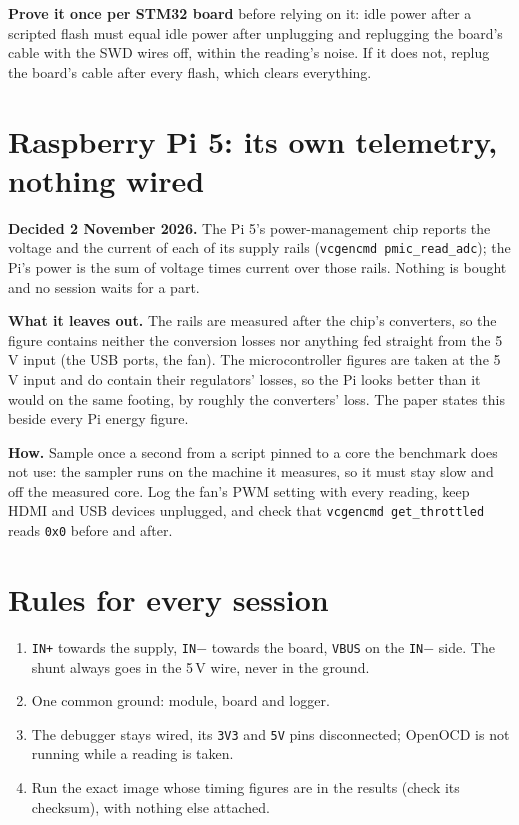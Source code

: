 \documentclass[11pt]{article}
\newcommand{\code}[1]{\texttt{#1}}
\begin{document}
\textbf{Prove it once per STM32 board} before relying on it: idle power after a scripted flash
must equal idle power after unplugging and replugging the board's cable with the SWD wires off,
within the reading's noise. If it does not, replug the board's cable after every flash, which
clears everything.

\section{\texorpdfstring{Raspberry Pi 5: its own telemetry, nothing wired}{Raspberry Pi 5: its own telemetry, nothing wired}}

\textbf{Decided 2 November 2026.} The Pi 5's power-management chip reports the voltage and the
current of each of its supply rails (\code{vcgencmd pmic\_read\_adc}); the Pi's power is the sum
of voltage times current over those rails. Nothing is bought and no session waits for a part.

\textbf{What it leaves out.} The rails are measured after the chip's converters, so the figure
contains neither the conversion losses nor anything fed straight from the 5\,V input (the USB
ports, the fan). The microcontroller figures are taken at the 5\,V input and do contain their
regulators' losses, so the Pi looks better than it would on the same footing, by roughly the
converters' loss. The paper states this beside every Pi energy figure.

\textbf{How.} Sample once a second from a script pinned to a core the benchmark does not use:
the sampler runs on the machine it measures, so it must stay slow and off the measured core.
Log the fan's PWM setting with every reading, keep HDMI and USB devices unplugged, and check
that \code{vcgencmd get\_throttled} reads \code{0x0} before and after.

\section{Rules for every session}
\begin{enumerate}
\item \code{IN+} towards the supply, \code{IN$-$} towards the board, \code{VBUS} on the
\code{IN$-$} side. The shunt always goes in the 5\,V wire, never in the ground.
\item One common ground: module, board and logger.
\item The debugger stays wired, its \code{3V3} and \code{5V} pins disconnected; OpenOCD is not
running while a reading is taken.
\item Run the exact image whose timing figures are in the results (check its checksum),
with nothing else attached.
\end{enumerate}
\end{document}
